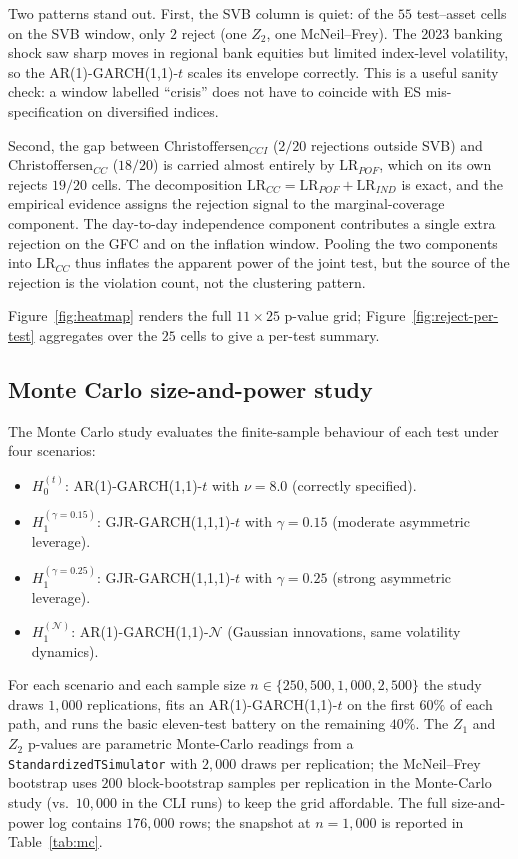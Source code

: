 \documentclass[11pt,a4paper]{article}
\newcommand{\code}[1]{\texttt{\small #1}}
\theoremstyle{plain}
\begin{document}
Two patterns stand out. First, the SVB column is quiet: of the $55$ test--asset cells on the SVB window, only $2$
reject (one $Z_2$, one McNeil--Frey). The 2023 banking shock saw
sharp moves in regional bank equities but limited index-level
volatility, so the AR(1)-GARCH(1,1)-$t$ scales its envelope correctly.
This is a useful sanity check: a window labelled ``crisis'' does not
have to coincide with ES mis-specification on diversified indices.

Second, the gap between $\mathrm{Christoffersen}_{CCI}$ ($2/20$
rejections outside SVB) and $\mathrm{Christoffersen}_{CC}$ ($18/20$)
is carried almost entirely by $\mathrm{LR}_{POF}$, which on its own
rejects $19/20$ cells. The decomposition $\mathrm{LR}_{CC} =
\mathrm{LR}_{POF} + \mathrm{LR}_{IND}$ is exact, and the empirical
evidence assigns the rejection signal to the marginal-coverage
component. The day-to-day independence component contributes a single
extra rejection on the GFC and on the inflation window. Pooling the
two components into $\mathrm{LR}_{CC}$ thus inflates the apparent
power of the joint test, but the source of the rejection is the
violation count, not the clustering pattern.

Figure~\ref{fig:heatmap} renders the full $11 \times 25$ p-value
grid; Figure~\ref{fig:reject-per-test} aggregates over the $25$ cells
to give a per-test summary.

\subsection{Monte Carlo size-and-power study}
\label{sec:res-mc}

The Monte Carlo study evaluates the finite-sample behaviour of each
test under four scenarios:
\begin{itemize}
  \item $H_0^{(t)}$: AR(1)-GARCH(1,1)-$t$ with $\nu = 8.0$
    (correctly specified).
  \item $H_1^{(\gamma=0.15)}$: GJR-GARCH(1,1,1)-$t$ with $\gamma = 0.15$
    (moderate asymmetric leverage).
  \item $H_1^{(\gamma=0.25)}$: GJR-GARCH(1,1,1)-$t$ with $\gamma = 0.25$
    (strong asymmetric leverage).
  \item $H_1^{(\mathcal{N})}$: AR(1)-GARCH(1,1)-$\mathcal{N}$
    (Gaussian innovations, same volatility dynamics).
\end{itemize}
For each scenario and each sample size $n \in \{250, 500, 1{,}000,
2{,}500\}$ the study draws $1{,}000$ replications, fits an
AR(1)-GARCH(1,1)-$t$ on the first $60\%$ of each path, and runs the
basic eleven-test battery on the remaining $40\%$. The $Z_1$ and $Z_2$
p-values are parametric Monte-Carlo readings from a
\code{StandardizedTSimulator} with $2{,}000$ draws per replication;
the McNeil--Frey bootstrap uses $200$ block-bootstrap samples per
replication in the Monte-Carlo study (vs.~$10{,}000$ in the CLI runs)
to keep the grid affordable. The full size-and-power log contains
$176{,}000$ rows; the snapshot at $n = 1{,}000$ is reported in
Table~\ref{tab:mc}.
\end{document}
